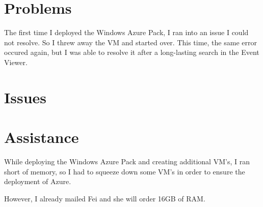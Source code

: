 \documentclass[11pt, a4paper]{article}
\begin{document}
\section*{Problems}

The first time I deployed the Windows Azure Pack, I ran into an issue I could not resolve. So I threw away the VM and started over. This time, the same error occured again, but I was able to resolve it after a long-lasting search in the Event Viewer.

\section*{Issues}



\section*{Assistance}

While deploying the Windows Azure Pack and creating additional VM's, I ran short of memory, so I had to squeeze down some VM's in order to ensure the deployment of Azure.

However, I already mailed Fei and she will order 16GB of RAM.
\end{document}
